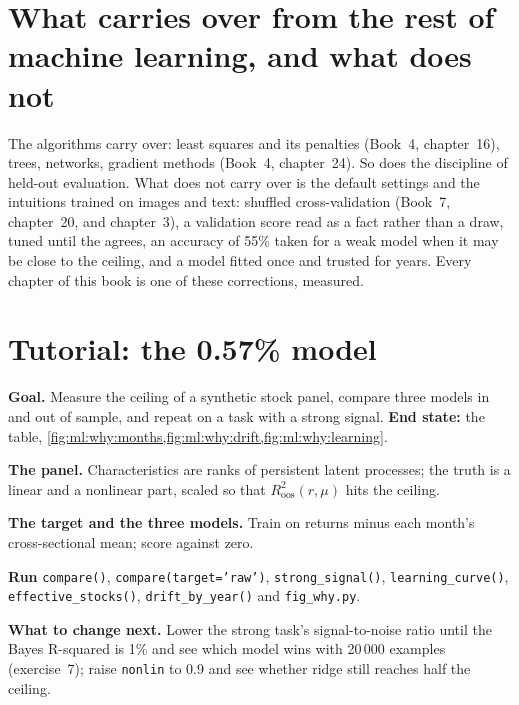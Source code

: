 \section{What carries over from the rest of machine learning, and what does not}

The algorithms carry over: least squares and its penalties (Book~4, chapter~16), trees, networks, gradient methods
(Book~4, chapter~24). So does the discipline of held-out evaluation. What does not carry over is the default settings
and the intuitions trained on images and text: shuffled cross-validation (Book~7, chapter~20, and
chapter~3), a validation score read as a fact rather than a draw,  tuned until the
 agrees, an accuracy of 55\% taken for a weak model when it may be close to the ceiling, and a model fitted
once and trusted for years. Every chapter of this book is one of these corrections, measured.

\section{Tutorial: the 0.57\% model}\label{tut:ml:why-financial-machine-learning-is-different:tut}

\begin{tutorial}
\textbf{Goal.} Measure the ceiling of a synthetic stock panel, compare three models in and out of sample, and repeat on
a task with a strong signal. \textbf{End state:} the table, \cref{fig:ml:why:months,fig:ml:why:drift,fig:ml:why:learning}.
\begin{tutsteps}
\item \textbf{The panel.} Characteristics are ranks of persistent latent processes; the truth is a linear and a
nonlinear part, scaled so that $R^2_{\mathrm{oos}}(r,\mu)$ hits the ceiling.
\label{lst:ml:why:panel}
\item \textbf{The target and the three models.} Train on returns minus each month's cross-sectional mean; score against
zero.
\label{lst:ml:why:compare}
\item \textbf{Run} \texttt{compare()}, \texttt{compare(target='raw')}, \texttt{strong\_signal()},
\texttt{learning\_curve()}, \texttt{effective\_stocks()}, \texttt{drift\_by\_year()} and \texttt{fig\_why.py}.
\end{tutsteps}
\textbf{What to change next.} Lower the strong task's signal-to-noise ratio until the Bayes R-squared is 1\% and see
which model wins with 20\,000 examples (exercise~7); raise
\texttt{nonlin} to 0.9 and see whether ridge still reaches half the ceiling.
\end{tutorial}

